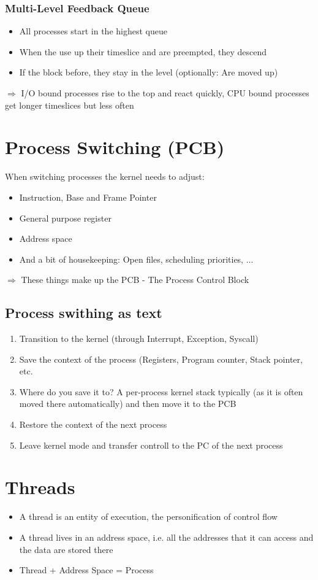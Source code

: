 \documentclass{kit}
\begin{document}
  \subsubsection{Multi-Level Feedback Queue}
    \begin{itemize}
      \item All processes start in the highest queue
      \item When the use up their timeslice and are preempted, they descend
      \item If the block before, they stay in the level (optionally: Are moved up)
    \end{itemize}
    $\Rightarrow$ I/O bound processes rise to the top and react quickly, CPU bound processes get longer timeslices but less
    often
\section{Process Switching (PCB)}
  When switching processes the kernel needs to adjust:
  \begin{itemize}
    \item Instruction, Base and Frame Pointer
    \item General purpose register
    \item Address space
    \item And a bit of housekeeping: Open files, scheduling priorities, ...
  \end{itemize}
  $\Rightarrow$ These things make up the PCB - The Process Control Block
  \subsection{Process swithing as text}
    \begin{enumerate}[label=\arabic*.]
      \item Transition to the kernel (through Interrupt, Exception, Syscall)
      \item Save the context of the process (Registers, Program counter, Stack pointer, etc.
      \item Where do you save it to? A per-process kernel stack typically (as it is often moved there automatically) and 
        then move it to the PCB
      \item Restore the context of the next process
      \item Leave kernel mode and transfer controll to the PC of the next process
    \end{enumerate}
\section{Threads}
  \begin{itemize}
    \item A thread is an entity of execution, the personification of control flow
    \item A thread lives in an address space, i.e. all the addresses that it can access and the data are stored there
    \item Thread + Address Space = Process
  \end{itemize}
\end{document}
